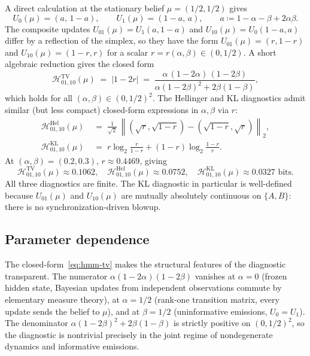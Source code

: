 \documentclass[11pt,a4paper]{article}
\theoremstyle{plain}
\theoremstyle{definition}
\theoremstyle{remark}
\newcommand{\eqdef}{\coloneqq}
\begin{document}
A direct calculation at the stationary belief $\mu = (1/2, 1/2)$ gives
\begin{equation}
    U_0(\mu) = (a,\, 1 - a), \qquad U_1(\mu) = (1 - a,\, a), \qquad a \eqdef 1 - \alpha - \beta + 2 \alpha \beta.
\end{equation}
The composite updates $U_{01}(\mu) = U_1(a, 1-a)$ and $U_{10}(\mu) = U_0(1-a, a)$ differ by a reflection of the simplex, so they have the form $U_{01}(\mu) = (r, 1-r)$ and $U_{10}(\mu) = (1-r, r)$ for a scalar $r = r(\alpha, \beta) \in (0, 1/2)$. A short algebraic reduction gives the closed form
\begin{equation}
\label{eq:hmm-tv}
    \mathcal{H}^{\mathrm{TV}}_{01,10}(\mu) \;=\; |1 - 2r| \;=\; \frac{\alpha\,(1 - 2\alpha)\,(1 - 2\beta)}{\alpha(1 - 2\beta)^2 + 2\beta(1 - \beta)},
\end{equation}
which holds for all $(\alpha, \beta) \in (0, 1/2)^2$. The Hellinger and KL diagnostics admit similar (but less compact) closed-form expressions in $\alpha, \beta$ via $r$:
\begin{align}
    \mathcal{H}^{\mathrm{Hel}}_{01,10}(\mu) &\;=\; \frac{1}{\sqrt{2}}\,\left\| (\sqrt{r}, \sqrt{1-r}) - (\sqrt{1-r}, \sqrt{r}) \right\|_2, \\
    \mathcal{H}^{\mathrm{KL}}_{01,10}(\mu) &\;=\; r \log_2 \tfrac{r}{1-r} + (1-r) \log_2 \tfrac{1-r}{r}.
\end{align}
At $(\alpha, \beta) = (0.2, 0.3)$, $r \approx 0.4469$, giving
\begin{equation}
    \mathcal{H}^{\mathrm{TV}}_{01,10}(\mu) \approx 0.1062, \quad
    \mathcal{H}^{\mathrm{Hel}}_{01,10}(\mu) \approx 0.0752, \quad
    \mathcal{H}^{\mathrm{KL}}_{01,10}(\mu) \approx 0.0327 \text{ bits}.
\end{equation}
All three diagnostics are finite. The KL diagnostic in particular is well-defined because $U_{01}(\mu)$ and $U_{10}(\mu)$ are mutually absolutely continuous on $\{A, B\}$: there is no synchronization-driven blowup.

\subsection{Parameter dependence}

The closed-form~\eqref{eq:hmm-tv} makes the structural features of the diagnostic transparent. The numerator $\alpha(1 - 2\alpha)(1 - 2\beta)$ vanishes at $\alpha = 0$ (frozen hidden state, Bayesian updates from independent observations commute by elementary measure theory), at $\alpha = 1/2$ (rank-one transition matrix, every update sends the belief to $\mu$), and at $\beta = 1/2$ (uninformative emissions, $U_0 = U_1$). The denominator $\alpha(1 - 2\beta)^2 + 2\beta(1 - \beta)$ is strictly positive on $(0, 1/2)^2$, so the diagnostic is nontrivial precisely in the joint regime of nondegenerate dynamics and informative emissions.
\end{document}
